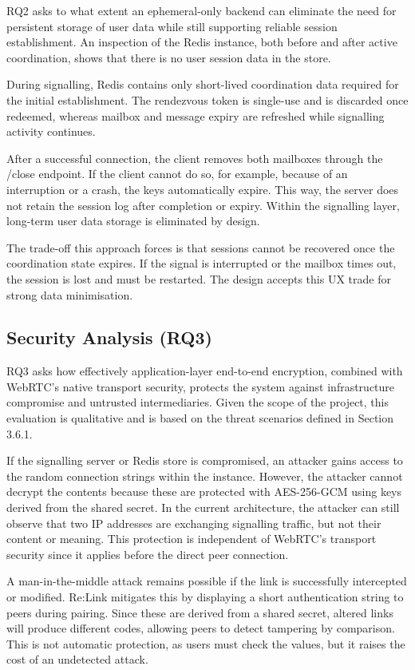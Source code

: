 \documentclass[12pt,a4paper]{article}
\begin{document}
RQ2 asks to what extent an ephemeral-only backend can eliminate the need for persistent storage of user data while still supporting reliable session establishment. An inspection of the Redis instance, both before and after active coordination, shows that there is no user session data in the store.

During signalling, Redis contains only short-lived coordination data required for the initial establishment. The rendezvous token is single-use and is discarded once redeemed, whereas mailbox and message expiry are refreshed while signalling activity continues.

After a successful connection, the client removes both mailboxes through the /close endpoint. If the client cannot do so, for example, because of an interruption or a crash, the keys automatically expire. This way, the server does not retain the session log after completion or expiry. Within the signalling layer, long-term user data storage is eliminated by design.

The trade-off this approach forces is that sessions cannot be recovered once the coordination state expires. If the signal is interrupted or the mailbox times out, the session is lost and must be restarted. The design accepts this UX trade for strong data minimisation.

\subsection{Security Analysis (RQ3)}

RQ3 asks how effectively application-layer end-to-end encryption, combined with WebRTC's native transport security, protects the system against infrastructure compromise and untrusted intermediaries. Given the scope of the project, this evaluation is qualitative and is based on the threat scenarios defined in Section 3.6.1.

If the signalling server or Redis store is compromised, an attacker gains access to the random connection strings within the instance. However, the attacker cannot decrypt the contents because these are protected with AES-256-GCM using keys derived from the shared secret. In the current architecture, the attacker can still observe that two IP addresses are exchanging signalling traffic, but not their content or meaning. This protection is independent of WebRTC’s transport security since it applies before the direct peer connection.

A man-in-the-middle attack remains possible if the link is successfully intercepted or modified. Re:Link mitigates this by displaying a short authentication string to peers during pairing. Since these are derived from a shared secret, altered links will produce different codes, allowing peers to detect tampering by comparison. This is not automatic protection, as users must check the values, but it raises the cost of an undetected attack.
\end{document}
